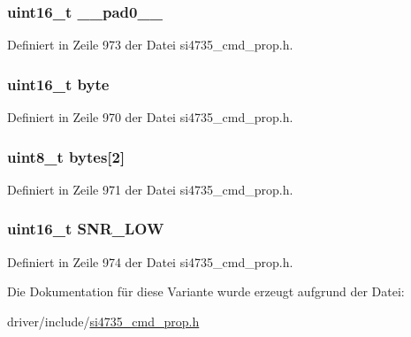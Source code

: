 \subsubsection[{\+\_\+\+\_\+pad0\+\_\+\+\_\+}]{\setlength{\rightskip}{0pt plus 5cm}uint16\+\_\+t \+\_\+\+\_\+pad0\+\_\+\+\_\+}\label{unionfm__hicut__snr__low__thres_a77132c2c26a75f5b8751b235cda23828}


Definiert in Zeile 973 der Datei si4735\+\_\+cmd\+\_\+prop.\+h.

\hypertarget{unionfm__hicut__snr__low__thres_ab0549c1b5ea980a02e7eab77e21fea49}{}
\subsubsection[{byte}]{\setlength{\rightskip}{0pt plus 5cm}uint16\+\_\+t byte}\label{unionfm__hicut__snr__low__thres_ab0549c1b5ea980a02e7eab77e21fea49}


Definiert in Zeile 970 der Datei si4735\+\_\+cmd\+\_\+prop.\+h.

\hypertarget{unionfm__hicut__snr__low__thres_a46e4c05d20a047ec169f60d3167e912e}{}
\subsubsection[{bytes}]{\setlength{\rightskip}{0pt plus 5cm}uint8\+\_\+t bytes\mbox{[}2\mbox{]}}\label{unionfm__hicut__snr__low__thres_a46e4c05d20a047ec169f60d3167e912e}


Definiert in Zeile 971 der Datei si4735\+\_\+cmd\+\_\+prop.\+h.

\hypertarget{unionfm__hicut__snr__low__thres_a085d572271ee279f8aa41b68466f752c}{}
\subsubsection[{S\+N\+R\+\_\+\+L\+O\+W}]{\setlength{\rightskip}{0pt plus 5cm}uint16\+\_\+t S\+N\+R\+\_\+\+L\+O\+W}\label{unionfm__hicut__snr__low__thres_a085d572271ee279f8aa41b68466f752c}


Definiert in Zeile 974 der Datei si4735\+\_\+cmd\+\_\+prop.\+h.



Die Dokumentation für diese Variante wurde erzeugt aufgrund der Datei\+:\begin{DoxyCompactItemize}
\item 
driver/include/\hyperlink{si4735__cmd__prop_8h}{si4735\+\_\+cmd\+\_\+prop.\+h}\end{DoxyCompactItemize}
